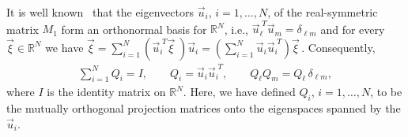 \documentclass{cmslatex}
\begin{document}
It is well known~\cite{Horn_Johnson-1990,Keener-2000} that the
eigenvectors $\vec{u}_i$, 
$i=1,\ldots,N$, of the real-symmetric matrix $M_1$ form an orthonormal basis for
$\mathbb{R}^N$, i.e., $\vec{u}_\ell^{\;T}\vec{u}_m=\delta_{\ell m}$  and for every
$\vec{\xi}\in\mathbb{R}^N$ we have
$\vec{\xi}=\sum_{i=1}^N(\vec{u}_i^{\;T}\vec{\xi}\;)\vec{u}_i
=\left(\sum_{i=1}^N\vec{u}_i\vec{u}_i^{\;T}\right)\vec{\xi}\,$. Consequently,         
%
\begin{align}\label{eq:Matrix_Rep_Spec_Theorem}
  \sum_{i=1}^NQ_i=I, \qquad
  Q_i=\vec{u}_i\vec{u}_i^{\;T},  \qquad
  Q_\ell Q_m=Q_\ell\,\delta_{\ell m},
\end{align}
%
where $I$ is the identity matrix on $\mathbb{R}^N$. Here, we have
defined $Q_i$, $i=1,\ldots,N$, to be the mutually orthogonal projection
matrices onto the eigenspaces spanned by the $\vec{u}_i$.
\end{document}
